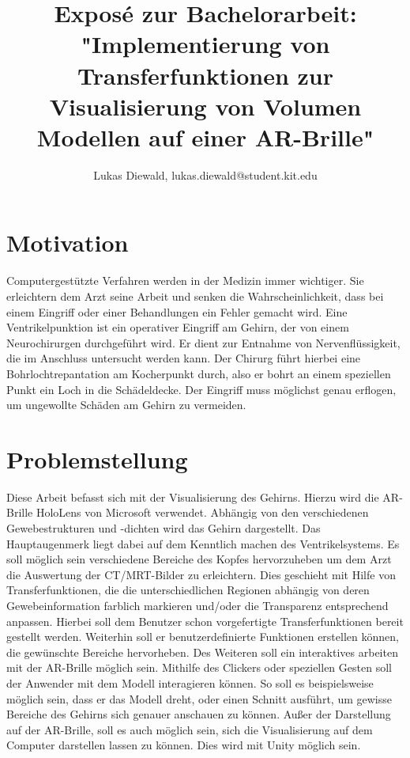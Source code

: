 \documentclass{article}
\title{
Exposé zur Bachelorarbeit:\\
 \textbf{"Implementierung von Transferfunktionen zur Visualisierung von Volumen Modellen auf einer AR-Brille"}
}
\author{Lukas Diewald, lukas.diewald@student.kit.edu}
\begin{document}
\maketitle

\section{Motivation}

Computergestützte Verfahren werden in der Medizin immer wichtiger. Sie erleichtern dem Arzt seine Arbeit und senken die Wahrscheinlichkeit, dass bei einem Eingriff oder einer Behandlungen ein Fehler gemacht wird.
\newline
Eine Ventrikelpunktion ist ein operativer Eingriff am Gehirn, der von einem Neurochirurgen durchgeführt wird. Er dient zur Entnahme von Nervenflüssigkeit, die im Anschluss untersucht werden kann. Der Chirurg führt hierbei eine Bohrlochtrepantation am Kocherpunkt durch, also er bohrt an einem speziellen Punkt ein Loch in die Schädeldecke. Der Eingriff muss möglichst genau erflogen, um ungewollte Schäden am Gehirn zu vermeiden.


\section{Problemstellung}

Diese Arbeit befasst sich mit der Visualisierung des Gehirns. Hierzu wird die AR-Brille  HoloLens von Microsoft verwendet. Abhängig von den verschiedenen Gewebestrukturen und -dichten wird das Gehirn dargestellt. Das Hauptaugenmerk liegt dabei auf dem Kenntlich machen des Ventrikelsystems.
\newline
Es soll möglich sein verschiedene Bereiche des Kopfes hervorzuheben um dem Arzt die Auswertung der CT/MRT-Bilder zu erleichtern. Dies geschieht mit Hilfe von Transferfunktionen, die die unterschiedlichen Regionen abhängig von deren Gewebeinformation farblich markieren und/oder die Transparenz entsprechend anpassen. Hierbei soll dem Benutzer schon vorgefertigte Transferfunktionen bereit gestellt werden. Weiterhin soll er benutzerdefinierte Funktionen erstellen können, die gewünschte Bereiche hervorheben.
\newline
Des Weiteren soll ein interaktives arbeiten mit der AR-Brille möglich sein. Mithilfe des Clickers oder speziellen Gesten soll der Anwender mit dem Modell interagieren können. So soll es beispielsweise möglich sein, dass er das Modell dreht, oder einen Schnitt ausführt, um gewisse Bereiche des Gehirns sich genauer anschauen zu können.
\newline
Außer der Darstellung auf der AR-Brille, soll es auch möglich sein, sich die Visualisierung auf dem Computer darstellen lassen zu können. Dies wird mit Unity möglich sein.
\end{document}
